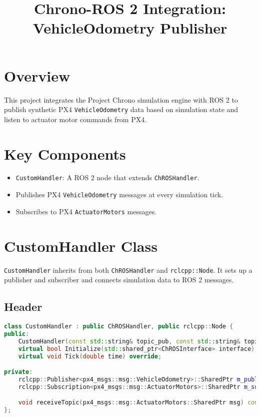 \documentclass{article}
\title{Chrono-ROS 2 Integration: VehicleOdometry Publisher}
\author{}
\date{}
\begin{document}
\maketitle

\section*{Overview}
This project integrates the Project Chrono simulation engine with ROS 2 to publish synthetic PX4 \texttt{VehicleOdometry} data based on simulation state and listen to actuator motor commands from PX4.

\section*{Key Components}
\begin{itemize}
    \item \texttt{CustomHandler}: A ROS 2 node that extends \texttt{ChROSHandler}.
    \item Publishes PX4 \texttt{VehicleOdometry} messages at every simulation tick.
    \item Subscribes to PX4 \texttt{ActuatorMotors} messages.
\end{itemize}

\section*{CustomHandler Class}
\texttt{CustomHandler} inherits from both \texttt{ChROSHandler} and \texttt{rclcpp::Node}. It sets up a publisher and subscriber and connects simulation data to ROS 2 messages.

\subsection*{Header}
\begin{lstlisting}[language=C++]
class CustomHandler : public ChROSHandler, public rclcpp::Node {
public:
    CustomHandler(const std::string& topic_pub, const std::string& topic_sub);
    virtual bool Initialize(std::shared_ptr<ChROSInterface> interface) override;
    virtual void Tick(double time) override;

private:
    rclcpp::Publisher<px4_msgs::msg::VehicleOdometry>::SharedPtr m_publisher;
    rclcpp::Subscription<px4_msgs::msg::ActuatorMotors>::SharedPtr m_subscriber;

    void receiveTopic(px4_msgs::msg::ActuatorMotors::SharedPtr msg) const;
};
\end{lstlisting}
\end{document}
